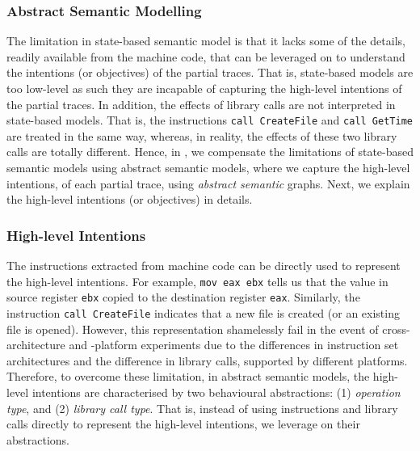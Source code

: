 \subsubsection{Abstract Semantic Modelling } \label{subsubsec:abs_sem_mod}

The limitation in state-based semantic model is that it lacks some of the details, readily available from the machine code, that can be leveraged on to understand the intentions (or objectives) of the partial traces. That is, state-based models are too low-level as such they are incapable of capturing the high-level intentions of the partial traces. In addition, the effects of library calls are not interpreted in state-based models. That is, the instructions \texttt{call CreateFile} and \texttt{call GetTime} are treated in the same way, whereas, in reality, the effects of these two library calls are totally different. Hence, in \tool, we compensate the limitations of state-based semantic models using abstract semantic models, where we capture the high-level intentions, of each partial trace, using \textit{abstract semantic} graphs. Next, we explain the high-level intentions (or objectives) in details.


\subsubsection*{High-level Intentions} 
The instructions extracted from  machine code can be directly used to represent the high-level intentions. For example, \texttt{mov eax ebx} tells us that the value in source register \texttt{ebx} copied to the destination register \texttt{eax}. Similarly, the instruction \texttt{call CreateFile} indicates that a new file is created (or an existing file is opened). However, this representation shamelessly fail in the event of cross-architecture and -platform experiments due to the differences in instruction set architectures and the difference in library calls, supported by different platforms. Therefore, to overcome these limitation, in abstract semantic models, the high-level intentions are characterised by two behavioural abstractions: (1) \textit{operation type}, and (2) \textit{library call type}. That is, instead of using instructions and library calls directly to represent the high-level intentions, we leverage on their abstractions.

